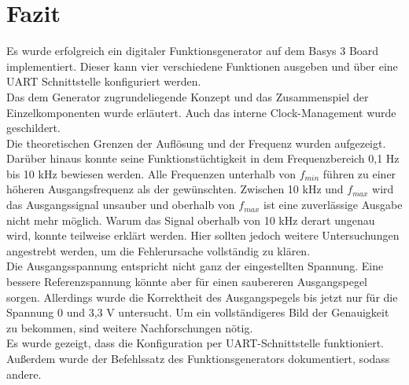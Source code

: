 \chapter{Fazit}
Es wurde erfolgreich ein digitaler Funktionsgenerator auf dem Basys 3 Board implementiert.
Dieser kann vier verschiedene Funktionen ausgeben und über eine UART Schnittstelle konfiguriert werden. \\
Das dem Generator zugrundeliegende Konzept und das Zusammenspiel der Einzelkomponenten wurde erläutert.
Auch das interne Clock-Management wurde geschildert. \\
Die theoretischen Grenzen der Auflösung und der Frequenz wurden aufgezeigt. 
Darüber hinaus konnte seine Funktionstüchtigkeit in dem Frequenzbereich 0,1 Hz bis 10 kHz bewiesen werden.
Alle Frequenzen unterhalb von $f_{min}$ führen zu einer höheren Ausgangsfrequenz als der gewünschten.
Zwischen 10 kHz und $f_{max}$ wird das Ausgangssignal unsauber und oberhalb von $f_{max}$ ist eine zuverlässige Ausgabe nicht mehr möglich.
Warum das Signal oberhalb von 10 kHz derart ungenau wird, konnte teilweise erklärt werden.
Hier sollten jedoch weitere Untersuchungen angestrebt werden, um die Fehlerursache vollständig zu klären.\\
Die Ausgangsspannung entspricht nicht ganz der eingestellten Spannung.
Eine bessere Referenzspannung könnte aber für einen saubereren Ausgangspegel sorgen.
Allerdings wurde die Korrektheit des Ausgangspegels bis jetzt nur für die Spannung 0 und 3,3 V untersucht.
Um ein vollständigeres Bild der Genauigkeit zu bekommen, sind weitere Nachforschungen nötig.\\
Es wurde gezeigt, dass die Konfiguration per UART-Schnittstelle funktioniert.
Außerdem wurde der Befehlssatz des Funktionsgenerators dokumentiert, sodass andere.
